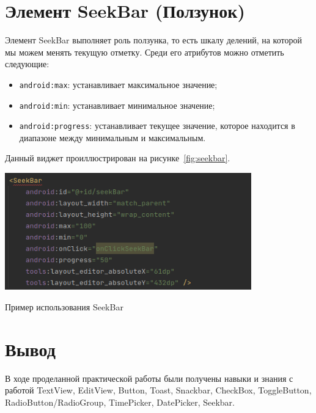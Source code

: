 \section{Элемент SeekBar (Ползунок)}
Элемент SeekBar выполняет роль ползунка, то есть шкалу делений, на 
которой мы можем менять текущую отметку. Среди его атрибутов можно 
отметить следующие:

\begin{itemize}
	\item \texttt{android:max}: устанавливает максимальное значение;
	\item \texttt{android:min}: устанавливает минимальное значение;
	\item \texttt{android:progress}: устанавливает текущее значение,
		которое находится в диапазоне между минимальным и максимальным.
\end{itemize}

Данный виджет проиллюстрирован на рисунке~\ref{fig:seekbar}.

\begin{image}
	\includegraphics[width=0.8\textwidth]{Screenshot from 2023-03-25 18-11-54.png}
	\caption{Пример использования SeekBar}
	\label{fig:seekbar}
\end{image}


\clearpage

\section*{\LARGE{Вывод}}
В ходе проделанной практической работы были получены навыки и 
знания с работой TextView, EditView, Button, Toast, Snackbar, CheckBox, 
ToggleButton, RadioButton/RadioGroup, TimePicker, DatePicker, Seekbar.

